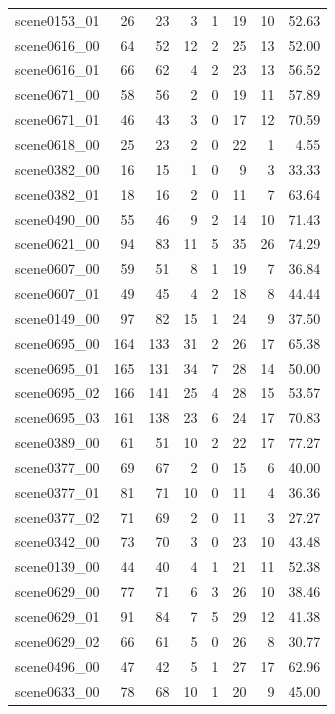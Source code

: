 \begin{table}[t]
\begin{tabular}{lrrrrrrr}
scene0153\_01 & 26 & 23 & 3 & 1 & 19 & 10 & 52.63 \\
scene0616\_00 & 64 & 52 & 12 & 2 & 25 & 13 & 52.00 \\
scene0616\_01 & 66 & 62 & 4 & 2 & 23 & 13 & 56.52 \\
scene0671\_00 & 58 & 56 & 2 & 0 & 19 & 11 & 57.89 \\
scene0671\_01 & 46 & 43 & 3 & 0 & 17 & 12 & 70.59 \\
scene0618\_00 & 25 & 23 & 2 & 0 & 22 & 1 & 4.55 \\
scene0382\_00 & 16 & 15 & 1 & 0 & 9 & 3 & 33.33 \\
scene0382\_01 & 18 & 16 & 2 & 0 & 11 & 7 & 63.64 \\
scene0490\_00 & 55 & 46 & 9 & 2 & 14 & 10 & 71.43 \\
scene0621\_00 & 94 & 83 & 11 & 5 & 35 & 26 & 74.29 \\
scene0607\_00 & 59 & 51 & 8 & 1 & 19 & 7 & 36.84 \\
scene0607\_01 & 49 & 45 & 4 & 2 & 18 & 8 & 44.44 \\
scene0149\_00 & 97 & 82 & 15 & 1 & 24 & 9 & 37.50 \\
scene0695\_00 & 164 & 133 & 31 & 2 & 26 & 17 & 65.38 \\
scene0695\_01 & 165 & 131 & 34 & 7 & 28 & 14 & 50.00 \\
scene0695\_02 & 166 & 141 & 25 & 4 & 28 & 15 & 53.57 \\
scene0695\_03 & 161 & 138 & 23 & 6 & 24 & 17 & 70.83 \\
scene0389\_00 & 61 & 51 & 10 & 2 & 22 & 17 & 77.27 \\
scene0377\_00 & 69 & 67 & 2 & 0 & 15 & 6 & 40.00 \\
scene0377\_01 & 81 & 71 & 10 & 0 & 11 & 4 & 36.36 \\
scene0377\_02 & 71 & 69 & 2 & 0 & 11 & 3 & 27.27 \\
scene0342\_00 & 73 & 70 & 3 & 0 & 23 & 10 & 43.48 \\
scene0139\_00 & 44 & 40 & 4 & 1 & 21 & 11 & 52.38 \\
scene0629\_00 & 77 & 71 & 6 & 3 & 26 & 10 & 38.46 \\
scene0629\_01 & 91 & 84 & 7 & 5 & 29 & 12 & 41.38 \\
scene0629\_02 & 66 & 61 & 5 & 0 & 26 & 8 & 30.77 \\
scene0496\_00 & 47 & 42 & 5 & 1 & 27 & 17 & 62.96 \\
scene0633\_00 & 78 & 68 & 10 & 1 & 20 & 9 & 45.00 \\

\end{tabular}
\end{table}
